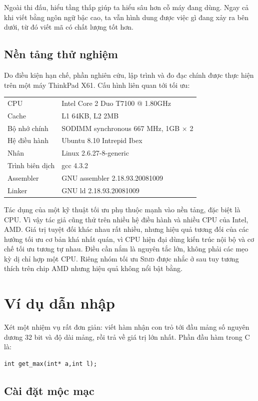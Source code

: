 \documentclass[11pt]{article}
\newcommand{\SIMD}{\textsc{Simd}}
\begin{document}
Ngoài thi đấu, hiểu tầng thấp giúp ta hiểu sâu hơn cỗ máy đang dùng. Ngay cả
khi viết bằng ngôn ngữ bậc cao, ta vẫn hình dung được việc gì đang xảy ra bên
dưới, từ đó viết mã có chất lượng tốt hơn.

\subsection{Nền tảng thử nghiệm}

Do điều kiện hạn chế, phần nghiên cứu, lập trình và đo đạc chính được thực
hiện trên một máy ThinkPad X61. Cấu hình liên quan tới tối ưu:
\begin{center}
\begin{tabular}{ll}
CPU & Intel Core 2 Duo T7100 @ 1.80GHz\\
Cache & L1 64KB, L2 2MB\\
Bộ nhớ chính & SODIMM synchronous 667 MHz, 1GB \(\times\) 2\\
Hệ điều hành & Ubuntu 8.10 Intrepid Ibex\\
Nhân & Linux 2.6.27-8-generic\\
Trình biên dịch & gcc 4.3.2\\
Assembler & GNU assembler 2.18.93.20081009\\
Linker & GNU ld 2.18.93.20081009
\end{tabular}
\end{center}

Tác dụng của một kỹ thuật tối ưu phụ thuộc mạnh vào nền tảng, đặc biệt là CPU.
Vì vậy tác giả cũng thử trên nhiều hệ điều hành và nhiều CPU của Intel, AMD.
Giá trị tuyệt đối khác nhau rất nhiều, nhưng hiệu quả tương đối của các hướng
tối ưu cơ bản khá nhất quán, vì CPU hiện đại dùng kiến trúc nội bộ và cơ chế
tối ưu tương tự nhau. Điều cần nắm là nguyên tắc lớn, không phải các mẹo kỳ dị
chỉ hợp một CPU. Riêng nhóm tối ưu \SIMD{} được nhắc ở sau tuy tương thích
trên chip AMD nhưng hiệu quả không nổi bật bằng.

\section{Ví dụ dẫn nhập}

Xét một nhiệm vụ rất đơn giản: viết hàm nhận con trỏ tới đầu mảng số nguyên
dương 32 bit và độ dài mảng, rồi trả về giá trị lớn nhất. Phần đầu hàm trong C
là:
\begin{verbatim}
int get_max(int* a,int l);
\end{verbatim}

\subsection{Cài đặt mộc mạc}
\end{document}
